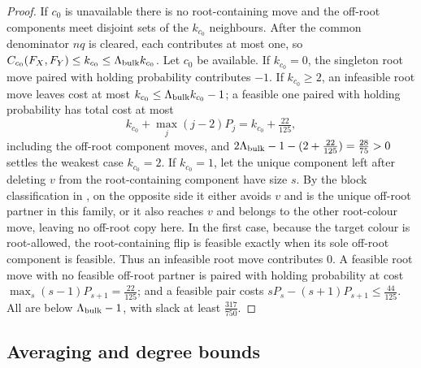 \begin{proof}
If $c_0$ is unavailable there is no root-containing move and the off-root
components meet disjoint sets of the \(k_{c_0}\) neighbours.  After the
common denominator \(nq\) is cleared, each contributes at most one, so
\(C_{c_0}(F_X,F_Y)\le k_{c_0}\le\Lambda_{\rm bulk}k_{c_0}\). Let \(c_0\) be
available. If \(k_{c_0}=0\), the singleton root move paired with holding
probability contributes \(-1\). If \(k_{c_0}\ge2\), an infeasible root move leaves
cost at most \(k_{c_0}\le\Lambda_{\rm bulk}k_{c_0}-1\); a feasible one paired with
holding probability has total cost at most
\[
  k_{c_0}+\max_j(j-2)P_j=k_{c_0}+\tfrac{22}{125},
\]
including the off-root component moves, and
$2\Lambda_{\rm bulk}-1-(2+\tfrac{22}{125})
=\tfrac{28}{75}>0$ settles the weakest case \(k_{c_0}=2\). If \(k_{c_0}=1\), let the unique
component left after deleting $v$ from the root-containing component have
size $s$.  By the block classification in
, on the opposite side it either avoids \(v\)
and is the unique off-root partner in this family, or it also reaches \(v\)
and belongs to the other root-colour move, leaving no off-root copy here.
In the first case, because the target colour is root-allowed, the
root-containing flip is feasible exactly when its sole off-root component
is feasible.  Thus an infeasible root move contributes $0$. A feasible root move with no
feasible off-root partner is paired with holding probability at cost
$\max_s(s-1)P_{s+1}=\tfrac{22}{125}$; and a feasible pair costs
$sP_s-(s+1)P_{s+1}\le\tfrac{44}{125}$. All are below
$\Lambda_{\rm bulk}-1$, with slack at least $\tfrac{317}{750}$.
\end{proof}

\subsection{Averaging and degree bounds}

